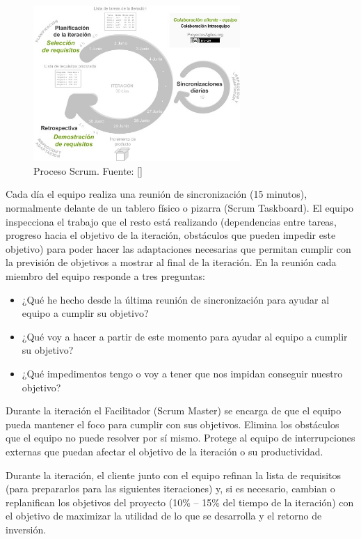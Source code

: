 {{            \begin{figure}[H]
              \centering
              \includegraphics[width=0.7\textwidth]{img/MetodologiaScrum.jpeg}
              \caption{Proceso Scrum. Fuente: [\cite{scrum2021}]}
              \label{fig:scrum}
            \end{figure}Cada día el equipo realiza una reunión de sincronización (15 minutos), normalmente delante de un tablero físico o pizarra (Scrum Taskboard). El equipo inspecciona el trabajo que el resto está realizando (dependencias entre tareas, progreso hacia el objetivo de la iteración, obstáculos que pueden impedir este objetivo) para poder hacer las adaptaciones necesarias que permitan cumplir con la previsión de objetivos a mostrar al final de la iteración. En la reunión cada miembro del equipo responde a tres preguntas: 

\begin{itemize}
    \item ¿Qué he hecho desde la última reunión de sincronización para ayudar al equipo a cumplir su objetivo?
    \item ¿Qué voy a hacer a partir de este momento para ayudar al equipo a cumplir su objetivo?
    \item ¿Qué impedimentos tengo o voy a tener que nos impidan conseguir nuestro objetivo?
\end{itemize}

Durante la iteración el Facilitador (Scrum Master) se encarga de que el equipo pueda mantener el foco para cumplir con sus objetivos. 
Elimina los obstáculos que el equipo no puede resolver por sí mismo. 
Protege al equipo de interrupciones externas que puedan afectar el objetivo de la iteración o su productividad. 

Durante la iteración, el cliente junto con el equipo refinan la lista de requisitos (para prepararlos para las siguientes iteraciones) y, si es necesario, cambian o replanifican los objetivos del proyecto (10\% -- 15\% del tiempo de la iteración)
 con el objetivo de maximizar la utilidad de lo que se desarrolla y el retorno de inversión. 

}}
